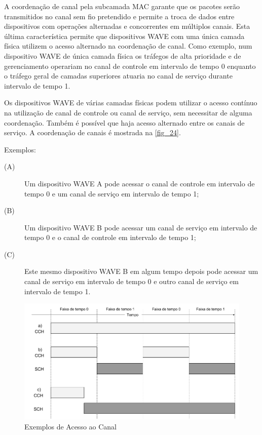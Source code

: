 \documentclass[
12pt,				%
openright,			%
oneside,			%
a4paper,			%
brazil,				%
]{abntex2}
\begin{document}
	\par A coordenação de canal pela subcamada MAC garante que os pacotes serão transmitidos no canal sem fio pretendido e permite a troca de dados entre dispositivos com operações alternadas e concorrentes em múltiplos canais. Esta última característica permite que dispositivos WAVE com uma única camada física utilizem o acesso alternado na coordenação de canal. Como exemplo, num dispositivo WAVE de única camada física os tráfegos de alta prioridade e de gerenciamento operariam no canal de controle em intervalo de tempo 0 enquanto o tráfego geral de camadas superiores atuaria no canal de serviço durante intervalo de tempo 1. 
	
	\par Os dispositivos WAVE de várias camadas físicas podem utilizar o acesso contínuo na utilização de canal de controle ou canal de serviço, sem necessitar de alguma coordenação. Também é possível que haja acesso alternado entre os canais de serviço. A coordenação de canais é mostrada na \autoref{fig_24}.
	
	\begin{description}
        \item Exemplos:
    \end{description}
    
	\begin{description}
		\item[(A)] Um dispositivo WAVE A pode acessar o canal de controle em intervalo de tempo 0 e um canal de serviço em intervalo de tempo 1;
		\item[(B)] Um dispositivo WAVE B pode acessar um canal de serviço em intervalo de tempo 0 e o canal de controle em intervalo de tempo 1;
		\item[(C)] Este mesmo dispositivo WAVE B em algum tempo depois pode acessar um canal de serviço em intervalo de tempo 0 e outro canal de serviço em intervalo de tempo 1.	
	\end{description}
	
	\begin{figure} [H]
		\centering
		\includegraphics[scale=.5]{figuras/cap3/24ExemplosDeAcessoAoCanal}
		\caption{\label{fig_24}Exemplos de Acesso ao Canal}
	\end{figure}
	
\end{document}
